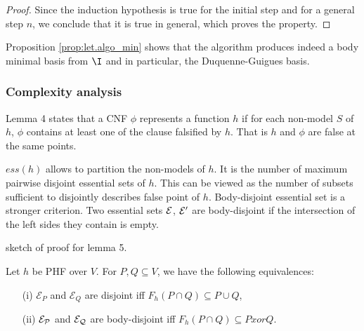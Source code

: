 \begin{proof}
\vspace{1.2em}

Since the induction hypothesis is true for the initial step and for a general 
step $n$, we conclude that it is true in general, which proves the property.

\end{proof} 

Proposition \ref{prop:let.algo_min} shows that the algorithm produces indeed a 
body minimal basis from $\I$ and in particular, the Duquenne-Guigues basis. 

\subsubsection{Complexity analysis}


Lemma 4 states that a CNF $\phi$ represents a function $h$ if for each non-model
$S$ of $h$, $\phi$ contains at least one of the clause falsified by $h$. That is
$h$ and $\phi$ are false at the same points.

$ess(h)$ allows to partition the non-models of $h$. It is the number of maximum
pairwise disjoint essential sets of $h$. This can be viewed as the number of
subsets sufficient to disjointly describes false point of $h$. Body-disjoint 
essential set is a stronger criterion. Two essential sets $\cal{E}$, $\cal{E}'$
are body-disjoint if the intersection of the left sides they contain is empty.

sketch of proof for lemma 5. 

\begin{lemma} Let $h$ be PHF over $V$. For $P, Q \subseteq V$, we have the 
following equivalences:

\begin{itemize}
	\item[(i)] $\mathcal{E}_P$ and $\mathcal{E}_Q$ are disjoint iff $F_h(P \cap
		Q) \subseteq P \cup Q$,
	
	\item[(ii)] $\cal{E}_P$ and $\cal{E}_Q$ are body-disjoint iff $F_h(P
	 	\cap Q) \subseteq P xor Q$.
\end{itemize}
	
\end{lemma} 

